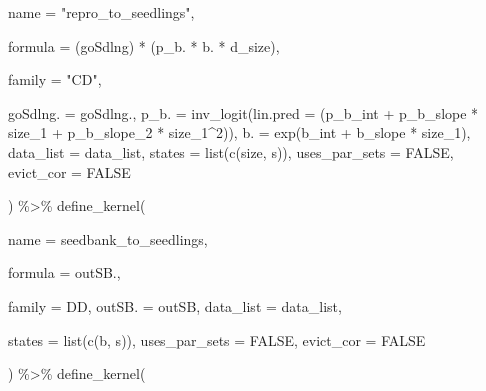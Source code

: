 \documentclass[
]{article}
\newenvironment{Shaded}{\begin{snugshade}}{\end{snugshade}}
\newcommand{\AttributeTok}[1]{\textcolor[rgb]{0.77,0.63,0.00}{#1}}
\newcommand{\ConstantTok}[1]{\textcolor[rgb]{0.00,0.00,0.00}{#1}}
\newcommand{\DecValTok}[1]{\textcolor[rgb]{0.00,0.00,0.81}{#1}}
\newcommand{\FunctionTok}[1]{\textcolor[rgb]{0.00,0.00,0.00}{#1}}
\newcommand{\NormalTok}[1]{#1}
\newcommand{\SpecialCharTok}[1]{\textcolor[rgb]{0.00,0.00,0.00}{#1}}
\newcommand{\StringTok}[1]{\textcolor[rgb]{0.31,0.60,0.02}{#1}}
\begin{document}
\begin{Shaded}
\begin{Highlighting}[]
    \AttributeTok{name    =} \StringTok{"repro\_to\_seedlings"}\NormalTok{,}
   
    \AttributeTok{formula       =}\NormalTok{ (goSdlng) }\SpecialCharTok{*}\NormalTok{ (p\_b. }\SpecialCharTok{*}\NormalTok{ b. }\SpecialCharTok{*}\NormalTok{ d\_size),}

    \AttributeTok{family        =} \StringTok{"CD"}\NormalTok{,}
    
    \AttributeTok{goSdlng.      =}\NormalTok{ goSdlng.,}
    \AttributeTok{p\_b.          =} \FunctionTok{inv\_logit}\NormalTok{(}\AttributeTok{lin.pred =}\NormalTok{ (p\_b\_int }\SpecialCharTok{+}\NormalTok{ p\_b\_slope }\SpecialCharTok{*}\NormalTok{ size\_1 }\SpecialCharTok{+}\NormalTok{ p\_b\_slope\_2 }\SpecialCharTok{*}\NormalTok{ size\_1}\SpecialCharTok{\^{}}\DecValTok{2}\NormalTok{)),}
    \AttributeTok{b.            =} \FunctionTok{exp}\NormalTok{(b\_int }\SpecialCharTok{+}\NormalTok{ b\_slope }\SpecialCharTok{*}\NormalTok{ size\_1),}
    \AttributeTok{data\_list     =}\NormalTok{ data\_list,}
    \AttributeTok{states        =} \FunctionTok{list}\NormalTok{(}\FunctionTok{c}\NormalTok{(}\StringTok{\textquotesingle{}size\textquotesingle{}}\NormalTok{, }\StringTok{\textquotesingle{}s\textquotesingle{}}\NormalTok{)),}
    \AttributeTok{uses\_par\_sets =} \ConstantTok{FALSE}\NormalTok{,}
    \AttributeTok{evict\_cor     =} \ConstantTok{FALSE}

\NormalTok{) }\SpecialCharTok{\%\textgreater{}\%}
  \FunctionTok{define\_kernel}\NormalTok{(}
    
    \AttributeTok{name          =} \StringTok{\textquotesingle{}seedbank\_to\_seedlings\textquotesingle{}}\NormalTok{,}
    
    \AttributeTok{formula       =}\NormalTok{ outSB.,}
    
    \AttributeTok{family        =} \StringTok{\textquotesingle{}DD\textquotesingle{}}\NormalTok{,}
    \AttributeTok{outSB.        =}\NormalTok{ outSB,}
    \AttributeTok{data\_list     =}\NormalTok{ data\_list,}
    
    \AttributeTok{states        =} \FunctionTok{list}\NormalTok{(}\FunctionTok{c}\NormalTok{(}\StringTok{\textquotesingle{}b\textquotesingle{}}\NormalTok{, }\StringTok{\textquotesingle{}s\textquotesingle{}}\NormalTok{)),}
    \AttributeTok{uses\_par\_sets =} \ConstantTok{FALSE}\NormalTok{,}
    \AttributeTok{evict\_cor =} \ConstantTok{FALSE}
    
\NormalTok{  ) }\SpecialCharTok{\%\textgreater{}\%}
  \FunctionTok{define\_kernel}\NormalTok{(}
    

\end{Highlighting}
\end{Shaded}
\end{document}
